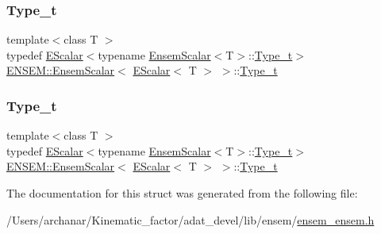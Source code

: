 \subsubsection{\texorpdfstring{Type\_t}{Type\_t}\hspace{0.1cm}{\footnotesize\ttfamily [1/2]}}
{\footnotesize\ttfamily template$<$class T $>$ \\
typedef \mbox{\hyperlink{classENSEM_1_1EScalar}{E\+Scalar}}$<$typename \mbox{\hyperlink{structENSEM_1_1EnsemScalar}{Ensem\+Scalar}}$<$T$>$\+::\mbox{\hyperlink{structENSEM_1_1EnsemScalar_3_01EScalar_3_01T_01_4_01_4_a1c2a1f5745c75b422ce4629dcc4d98c9}{Type\+\_\+t}}$>$ \mbox{\hyperlink{structENSEM_1_1EnsemScalar}{E\+N\+S\+E\+M\+::\+Ensem\+Scalar}}$<$ \mbox{\hyperlink{classENSEM_1_1EScalar}{E\+Scalar}}$<$ T $>$ $>$\+::\mbox{\hyperlink{structENSEM_1_1EnsemScalar_3_01EScalar_3_01T_01_4_01_4_a1c2a1f5745c75b422ce4629dcc4d98c9}{Type\+\_\+t}}}

\mbox{\label{structENSEM_1_1EnsemScalar_3_01EScalar_3_01T_01_4_01_4_a1c2a1f5745c75b422ce4629dcc4d98c9}} 
\subsubsection{\texorpdfstring{Type\_t}{Type\_t}\hspace{0.1cm}{\footnotesize\ttfamily [2/2]}}
{\footnotesize\ttfamily template$<$class T $>$ \\
typedef \mbox{\hyperlink{classENSEM_1_1EScalar}{E\+Scalar}}$<$typename \mbox{\hyperlink{structENSEM_1_1EnsemScalar}{Ensem\+Scalar}}$<$T$>$\+::\mbox{\hyperlink{structENSEM_1_1EnsemScalar_3_01EScalar_3_01T_01_4_01_4_a1c2a1f5745c75b422ce4629dcc4d98c9}{Type\+\_\+t}}$>$ \mbox{\hyperlink{structENSEM_1_1EnsemScalar}{E\+N\+S\+E\+M\+::\+Ensem\+Scalar}}$<$ \mbox{\hyperlink{classENSEM_1_1EScalar}{E\+Scalar}}$<$ T $>$ $>$\+::\mbox{\hyperlink{structENSEM_1_1EnsemScalar_3_01EScalar_3_01T_01_4_01_4_a1c2a1f5745c75b422ce4629dcc4d98c9}{Type\+\_\+t}}}



The documentation for this struct was generated from the following file\+:\begin{DoxyCompactItemize}
\item 
/\+Users/archanar/\+Kinematic\+\_\+factor/adat\+\_\+devel/lib/ensem/\mbox{\hyperlink{lib_2ensem_2ensem__ensem_8h}{ensem\+\_\+ensem.\+h}}\end{DoxyCompactItemize}
